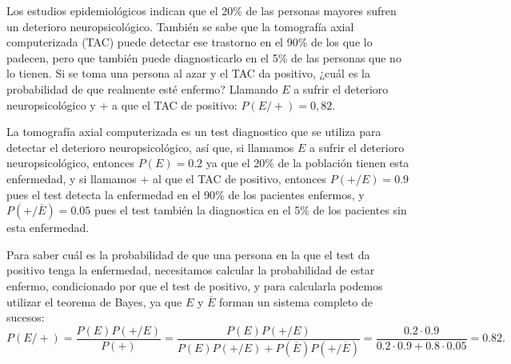 {Los estudios epidemiológicos indican que el 20\% de las personas mayores sufren un deterioro neuropsicológico.
También se sabe que la tomografía axial computerizada (TAC) puede detectar ese trastorno en el 90\% de los que lo
padecen, pero que también puede diagnosticarlo en el 5\% de las personas que no lo tienen.
Si se toma una persona al azar y el TAC da positivo, ¿cuál es la probabilidad de que realmente esté enfermo? } 
{Llamando $E$ a sufrir el deterioro neuropsicológico y $+$ a que el TAC de positivo: $P(E/+)=0,82$.
}
{La tomografía axial computerizada es un test diagnostico que se utiliza para detectar el deterioro neuropsicológico,
así que, si llamamos $E$ a sufrir el deterioro neuropsicológico, entonces $P(E)=0.2$ ya que el 20\% de la población
tienen esta enfermedad, y si llamamos $+$ al que el TAC de positivo, entonces $P(+/E)=0.9$ pues el test detecta la
enfermedad en el 90\% de los pacientes enfermos, y $P(+/\overline{E})=0.05$ pues el test también la diagnostica en el
5\% de los pacientes sin esta enfermedad.

Para saber cuál es la probabilidad de que una persona en la que el test da positivo tenga la enfermedad, necesitamos
calcular la probabilidad de estar enfermo, condicionado por que el test de positivo, y para calcularla podemos utilizar
el teorema de Bayes, ya que $E$ y $\overline{E}$ forman un sistema completo de sucesos:
\[
P(E/+) = \frac{P(E)P(+/E)}{P(+)} = \frac{P(E)P(+/E)}{P(E)P(+/E)+P(\overline{E})P(+/\overline{E})} = \frac{0.2\cdot
0.9}{0.2\cdot 0.9+0.8\cdot 0.05} = 0.82.
\]
}


